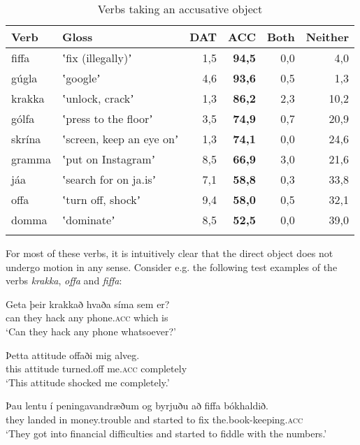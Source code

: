 \documentclass[output=paper,modfonts,nonflat,colorlinks,citecolor=brown]{langsci/langscibook}
\begin{document}
{\begin{table}
{\caption{\label{tab:jonsson:3}Verbs taking an accusative object} }
\begin{tabularx}{\textwidth}{Xlrrrr} 
\lsptoprule
Verb & Gloss & DAT & \textbf{ACC} & Both & Neither\\
\midrule 
fiffa & ʽfix (illegally)ʼ & 1,5 & \textbf{94,5} & 0,0 & 4,0\\
gúgla & ʽgoogleʼ & 4,6 & \textbf{93,6} & 0,5 & 1,3\\
krakka & ʽunlock, crackʼ & 1,3 & \textbf{86,2} & 2,3 & 10,2\\
gólfa & ʽpress to the floorʼ & 3,5 & \textbf{74,9} & 0,7 & 20,9\\
skrína & ʽscreen, keep an eye onʼ & 1,3 & \textbf{74,1} & 0,0 & 24,6\\
gramma & ʽput on Instagramʼ & 8,5 & \textbf{66,9} & 3,0 & 21,6\\
jáa & ʽsearch for on ja.isʼ & 7,1 & \textbf{58,8} & 0,3 & 33,8\\
offa & ʽturn off, shockʼ & 9,4 & \textbf{58,0} & 0,5 & 32,1\\
domma & ʽdominateʼ & 8,5 & \textbf{52,5} & 0,0 & 39,0\\
\lspbottomrule
\end{tabularx}
\end{table}

For most of these verbs, it is intuitively clear that the direct object does not undergo motion in any sense. Consider e.g. the following test examples of the verbs \textit{krakka}, \textit{offa} and \textit{fiffa}:

 
\ea%
    \label{ex:jonsson:5} 
\ea
\gll  Geta  þeir  krakkað  hvaða  síma  sem  er?\\
   can  they  hack  any  phone.\textsc{acc}  which  is\\
\glt `Can they hack any phone whatsoever?'
 
\ex
\gll   Þetta  attitude  offaði  mig   alveg.\\
 this  attitude  turned.off  me.\textsc{acc}   completely\\
   \glt`This attitude shocked me completely.'
 

\ex
\gll   Þau  lentu  í  peningavandræðum  og  byrjuðu  að  fiffa  bókhaldið.\\
 they  landed  in  money.trouble  and  started  to  fix  the.book-keeping.\textsc{acc}\\
\glt `They got into financial difficulties and started to fiddle with the numbers.'
\z
\z

}
\end{document}
